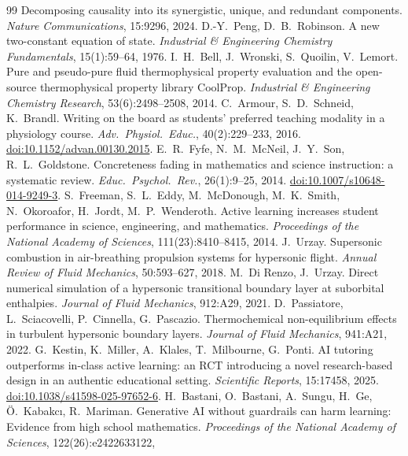 \documentclass[11pt]{article}
\newcommand{\NEW}[1]{\iffinal #1\else{\color{red}#1}\fi}
\begin{document}
\begin{thebibliography}{99}
Decomposing causality into its synergistic, unique, and redundant components. \emph{Nature
Communications}, 15:9296, 2024.
 D.-Y.\ Peng, D.\ B.\ Robinson. A new two-constant equation of
state. \emph{Industrial \& Engineering Chemistry Fundamentals}, 15(1):59--64, 1976.
 I.\ H.\ Bell, J.\ Wronski, S.\ Quoilin, V.\ Lemort. Pure and
pseudo-pure fluid thermophysical property evaluation and the open-source thermophysical
property library CoolProp. \emph{Industrial \& Engineering Chemistry Research},
53(6):2498--2508, 2014.
 C.\ Armour, S.\ D.\ Schneid, K.\ Brandl. Writing on the board as students' preferred teaching modality in a physiology course. \emph{Adv.\ Physiol.\ Educ.}, 40(2):229--233, 2016. \href{https://doi.org/10.1152/advan.00130.2015}{doi:10.1152/advan.00130.2015}.
 E.\ R.\ Fyfe, N.\ M.\ McNeil, J.\ Y.\ Son, R.\ L.\ Goldstone. Concreteness fading in mathematics and science instruction: a systematic review. \emph{Educ.\ Psychol.\ Rev.}, 26(1):9--25, 2014. \href{https://doi.org/10.1007/s10648-014-9249-3}{doi:10.1007/s10648-014-9249-3}.
 S.\ Freeman, S.\ L.\ Eddy, M.\ McDonough, M.\ K.\ Smith, N.\ Okoroafor,
H.\ Jordt, M.\ P.\ Wenderoth. Active learning increases student performance in science,
engineering, and mathematics. \emph{Proceedings of the National Academy of Sciences},
111(23):8410--8415, 2014.
 J.\ Urzay. Supersonic combustion in air-breathing propulsion systems for
hypersonic flight. \emph{Annual Review of Fluid Mechanics}, 50:593--627, 2018.
 M.\ Di Renzo, J.\ Urzay. Direct numerical simulation of a
hypersonic transitional boundary layer at suborbital enthalpies. \emph{Journal of Fluid
Mechanics}, 912:A29, 2021.
 D.\ Passiatore, L.\ Sciacovelli, P.\ Cinnella, G.\ Pascazio.
Thermochemical non-equilibrium effects in turbulent hypersonic boundary layers.
\emph{Journal of Fluid Mechanics}, 941:A21, 2022.
 G.\ Kestin, K.\ Miller, A.\ Klales, T.\ Milbourne, G.\ Ponti. AI tutoring
outperforms in-class active learning: an RCT introducing a novel research-based design in an
authentic educational setting. \emph{Scientific Reports}, 15\NEW{:17458}, 2025.
\href{https://doi.org/10.1038/s41598-025-97652-6}{doi:10.1038/s41598-025-97652-6}.
 H.\ Bastani, O.\ Bastani, A.\ Sungu, H.\ Ge, \"O.\ Kabakc\i{}, R.\
Mariman. Generative AI without guardrails can harm learning: Evidence from high school
mathematics. \emph{Proceedings of the National Academy of Sciences}, 122(26):e2422633122,

\end{thebibliography}
\end{document}
